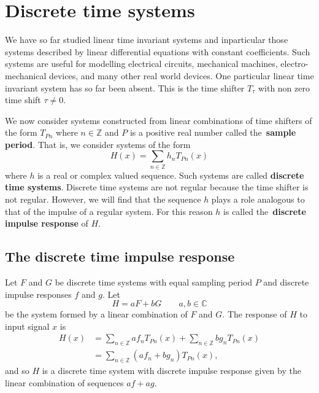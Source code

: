 \documentclass[11pt,a4paper]{book}
\theoremstyle{plain}
\numberwithin{equation}{section}
\newcommand{\ints}{{\mathbb Z}}
\newcommand{\complex}{{\mathbb C}}
\newcommand{\term}{\textbf}
\begin{document}


\chapter{Discrete time systems} \label{cha:discr-time-syst}

We have so far studied linear time invariant systems and inparticular those systems described by linear differential equations with constant coefficients.  Such systems are useful for modelling electrical circuits, mechanical machines, electro-mechanical devices, and many other real world devices.  One particular linear time invariant system has so far been absent. This is the time shifter $T_\tau$ with non zero time shift $\tau \neq 0$.  %

We now consider systems constructed from linear combinations of time shifters of the form $T_{Pn}$ where $n \in \ints$ and $P$ is a positive real number called the~\term{sample period}.  That is, we consider systems of the form
\[
H(x) = \sum_{n \in \ints} h_n T_{ P n}(x)
\]
where $h$ is a real or complex valued sequence.  Such systems are called \term{discrete time systems}.  Discrete time systems are not regular because the time shifter is not regular.  However, we will find that the sequence $h$ plays a role analogous to that of the impulse of a regular system.  For this reason $h$  is called the~\term{discrete impulse response} of $H$.


\section{The discrete time impulse response} \label{sec:discr-time-impulse}

Let $F$ and $G$ be discrete time systems with equal sampling period $P$ and discrete impulse responses $f$ and $g$.  Let 
\[
H = a F + b G \qquad a,b\in\complex
\]
be the system formed by a linear combination of $F$ and $G$.  The response of $H$ to input signal $x$ is
\begin{align*}
H(x) &= \sum_{n \in \ints} a f_{n} T_{ P n}(x) + \sum_{n \in \ints} b g_{n} T_{ P n}(x) \\
&=  \sum_{n \in \ints} (a f_{n} + b g_{n}) T_{ P n}(x),
\end{align*}
and so $H$ is a discrete time system with discrete impulse response given by the linear combination of sequences $af + ag$.
\end{document}
